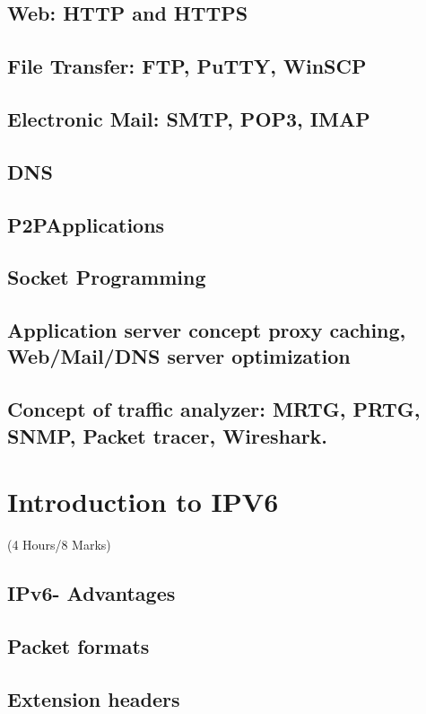\documentclass[12pt]{article}
\begin{document}
	\subsection{Web: HTTP and HTTPS}
	\subsection{File Transfer: FTP, PuTTY, WinSCP}
	\subsection{Electronic Mail: SMTP, POP3, IMAP}
	\subsection{DNS}
	\subsection{P2PApplications}
	\subsection{Socket Programming}
	\subsection{Application server concept proxy caching, Web/Mail/DNS server optimization}
	\subsection{Concept of traffic analyzer: MRTG, PRTG, SNMP, Packet tracer, Wireshark.}

	\pagebreak

\section{Introduction to IPV6}
	\begin{center}(4 Hours/8 Marks)\end{center}
	\subsection{IPv6- Advantages}
	\subsection{Packet formats}
	\subsection{Extension headers}
\end{document}
